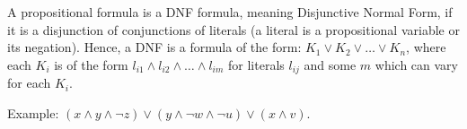 \documentclass[12pt]{article}
\begin{document}
A propositional formula is a DNF formula, meaning Disjunctive Normal Form, if it is a disjunction of conjunctions of literals (a literal is a propositional variable or its negation). Hence, a DNF is a formula of the form: $K_1 \vee K_2 \vee \ldots \vee K_n$, where each $K_i$ is of the form $l_{i1} \wedge l_{i2} \wedge \ldots \wedge l_{im}$ for literals $l_{ij}$ and some $m$ which can vary for each $K_i$.

Example: $(x\wedge  y \wedge \neg z) \vee (y\wedge \neg w \wedge \neg u) \vee (x \wedge v)$.
\end{document}
